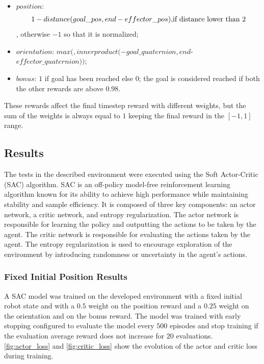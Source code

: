 \begin{itemize}
    \item $position$: \[1-distance(goal\_pos, end-effector\_pos), $if distance lower than 2$\],  otherwise $-1$ so that it is normalized;
    \item $orientation$: $max(, innerproduct(-goal\_quaternion, end$-$effector\_quaternion))$;
    \item $bonus$: $1$ if goal has been reached else $0$; the goal is considered reached if both the other rewards are above $0.98$.
\end{itemize}
\fi

These rewards affect the final timestep reward with different weights, but the sum of the weights is always equal to $1$ keeping the final reward in the $[-1, 1]$ range.

\subsection{Results}

The tests in the described environment were executed using the Soft Actor-Critic (SAC) algorithm. SAC is an off-policy model-free reinforcement learning algorithm known for its ability to achieve high performance while maintaining stability and sample efficiency. It is composed of three key components: an actor network, a critic network, and entropy regularization. The actor network is responsible for learning the policy and outputting the actions to be taken by the agent. The critic network is responsible for evaluating the actions taken by the agent. The entropy regularization is used to encourage exploration of the environment by introducing randomness or uncertainty in the agent's actions.

\subsubsection{Fixed Initial Position Results}

A SAC model was trained on the developed environment with a fixed initial robot state and with a $0.5$ weight on the position reward and a $0.25$ weight on the orientation and on the bonus reward. The model was trained with early stopping configured to evaluate the model every $500$ episodes and stop training if the evaluation average reward does not increase for $20$ evaluations. \autoref{fig:actor_loss} and \autoref{fig:critic_loss} show the evolution of the actor and critic loss during training.

